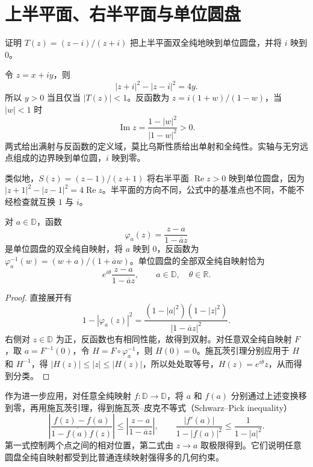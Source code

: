 \documentclass[UTF8,12pt,a4paper,fontset=fandol]{ctexbook}
\begin{document}
\section{上半平面、右半平面与单位圆盘}

\begin{example}[凯莱变换]
\label{ex:cv-cayley}
证明 $T(z)=(z-i)/(z+i)$ 把上半平面双全纯地映到单位圆盘，并将 $i$ 映到 $0$。
\end{example}
\begin{solve}
令 $z=x+iy$，则
\[
 |z+i|^2-|z-i|^2=4y.
\]
所以 $y>0$ 当且仅当 $|T(z)|<1$。反函数为 $z=i(1+w)/(1-w)$，当 $|w|<1$ 时
\[
 \operatorname{Im}z=\frac{1-|w|^2}{|1-w|^2}>0.
\]
两式给出满射与反函数的定义域，莫比乌斯性质给出单射和全纯性。实轴与无穷远点组成的边界映到单位圆，$i$ 映到零。
\end{solve}

类似地，$S(z)=(z-1)/(z+1)$ 将右半平面 $\operatorname{Re}z>0$ 映到单位圆盘，因为 $|z+1|^2-|z-1|^2=4\operatorname{Re}z$。半平面的方向不同，公式中的基准点也不同，不能不经检查就互换 $1$ 与 $i$。

\begin{proposition}[圆盘自同构]
\label{prop:cv-disk-auto}
对 $a\in\mathbb D$，函数
\[
 \varphi_a(z)=\frac{z-a}{1-\overline a z}
\]
是单位圆盘的双全纯自映射，将 $a$ 映到 $0$，反函数为 $\varphi_a^{-1}(w)=(w+a)/(1+\overline a w)$。单位圆盘的全部双全纯自映射恰为
\[
 e^{i\theta}\frac{z-a}{1-\overline a z},\qquad a\in\mathbb D,\quad\theta\in\mathbb R.
\]
\end{proposition}
\begin{proof}
直接展开有
\begin{equation}
 1-|\varphi_a(z)|^2
 =\frac{(1-|a|^2)(1-|z|^2)}{|1-\overline a z|^2}.
 \label{eq:cv-disk-auto}
\end{equation}
右侧对 $z\in\mathbb D$ 为正，反函数也有相同性能，故得到双射。对任意双全纯自映射 $F$，取 $a=F^{-1}(0)$，令 $H=F\circ\varphi_a^{-1}$，则 $H(0)=0$。施瓦茨引理分别应用于 $H$ 和 $H^{-1}$，得 $|H(z)|\le|z|\le|H(z)|$，所以处处取等号，$H(z)=e^{i\theta}z$，从而得到分类。
\end{proof}

作为进一步应用，对任意全纯映射 $f:\mathbb D\to\mathbb D$，将 $a$ 和 $f(a)$ 分别通过上述变换移到零，再用施瓦茨引理，得到施瓦茨--皮克不等式（Schwarz--Pick inequality）
\[
 \left|\frac{f(z)-f(a)}{1-\overline{f(a)}f(z)}\right|
 \le\left|\frac{z-a}{1-\overline a z}\right|,
 \qquad
 \frac{|f'(a)|}{1-|f(a)|^2}\le\frac1{1-|a|^2}.
\]
第一式控制两个点之间的相对位置，第二式由 $z\to a$ 取极限得到。它们说明任意圆盘全纯自映射都受到比普通连续映射强得多的几何约束。
\end{document}
